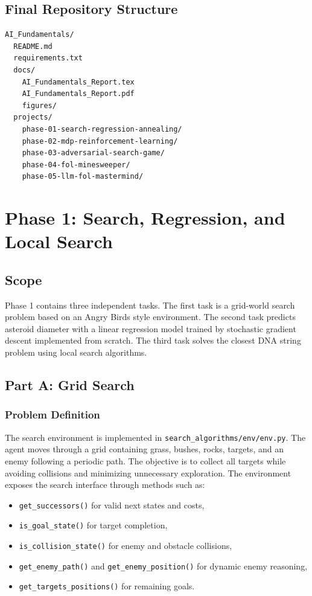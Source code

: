 \documentclass[11pt,a4paper]{article}
\newcommand{\code}[1]{\texttt{#1}}
\begin{document}
\subsection{Final Repository Structure}

\begin{lstlisting}
AI_Fundamentals/
  README.md
  requirements.txt
  docs/
    AI_Fundamentals_Report.tex
    AI_Fundamentals_Report.pdf
    figures/
  projects/
    phase-01-search-regression-annealing/
    phase-02-mdp-reinforcement-learning/
    phase-03-adversarial-search-game/
    phase-04-fol-minesweeper/
    phase-05-llm-fol-mastermind/
\end{lstlisting}

\section{Phase 1: Search, Regression, and Local Search}

\subsection{Scope}

Phase 1 contains three independent tasks. The first task is a grid-world search problem based on an Angry Birds style environment. The second task predicts asteroid diameter with a linear regression model trained by stochastic gradient descent implemented from scratch. The third task solves the closest DNA string problem using local search algorithms.

\subsection{Part A: Grid Search}

\subsubsection{Problem Definition}

The search environment is implemented in \code{search\_algorithms/env/env.py}. The agent moves through a grid containing grass, bushes, rocks, targets, and an enemy following a periodic path. The objective is to collect all targets while avoiding collisions and minimizing unnecessary exploration. The environment exposes the search interface through methods such as:

\begin{itemize}[leftmargin=*]
    \item \code{get\_successors()} for valid next states and costs,
    \item \code{is\_goal\_state()} for target completion,
    \item \code{is\_collision\_state()} for enemy and obstacle collisions,
    \item \code{get\_enemy\_path()} and \code{get\_enemy\_position()} for dynamic enemy reasoning,
    \item \code{get\_targets\_positions()} for remaining goals.
\end{itemize}
\end{document}

